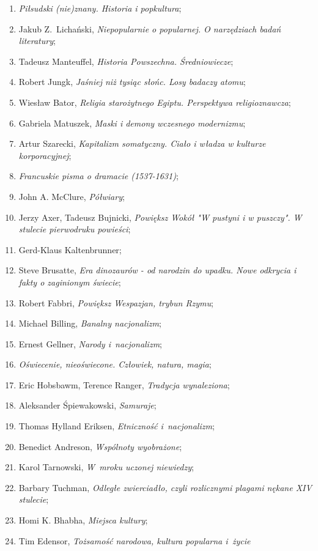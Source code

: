 \documentclass[a4paper,11pt]{article}
\begin{document}
\begin{enumerate}
\item \emph{Piłsudski (nie)znany. Historia i popkultura};
\item Jakub Z.~Lichański, \emph{Niepopularnie o popularnej. O
    narzędziach badań literatury};
\item Tadeusz Manteuffel, \emph{Historia Powszechna. Średniowiecze};
\item Robert Jungk, \emph{Jaśniej niż tysiąc słońc. Losy badaczy
    atomu};
\item Wiesław Bator, \emph{Religia starożytnego Egiptu. Perspektywa
    religioznawcza};
\item Gabriela Matuszek, \emph{Maski i demony wczesnego modernizmu};
\item Artur Szarecki, \emph{Kapitalizm somatyczny. Ciało i władza w
    kulturze korporacyjnej};
\item \emph{Francuskie pisma o dramacie (1537-1631)};
\item John A. McClure, \emph{Półwiary};
\item Jerzy Axer, Tadeusz Bujnicki, \emph{Powiększ Wokół "W pustyni i
    w puszczy". W stulecie pierwodruku powieści};
\item Gerd-Klaus Kaltenbrunner;
\item Steve Brusatte, \emph{Era dinozaurów - od narodzin do upadku.
    Nowe odkrycia i fakty o zaginionym świecie};
\item Robert Fabbri, \emph{Powiększ Wespazjan, trybun Rzymu};
\item Michael Billing, \emph{Banalny nacjonalizm};
\item Ernest Gellner, \emph{Narody i~nacjonalizm};
\item \emph{Oświecenie, nieoświecone. Człowiek, natura, magia};
\item Eric Hobsbawm, Terence Ranger, \emph{Tradycja wynaleziona};
\item Aleksander Śpiewakowski, \emph{Samuraje};
\item Thomas Hylland Eriksen, \emph{Etniczność i~nacjonalizm};
\item Benedict Andreson, \emph{Wspólnoty wyobrażone};
\item Karol Tarnowski, \emph{W~mroku uczonej niewiedzy};
\item Barbary Tuchman, \emph{Odległe zwierciadło, czyli rozlicznymi
    plagami nękane XIV stulecie};
\item Homi K. Bhabha, \emph{Miejsca kultury};
\item Tim Edensor, \emph{Tożsamość narodowa, kultura popularna i~życie
}
\end{enumerate}
\end{document}
